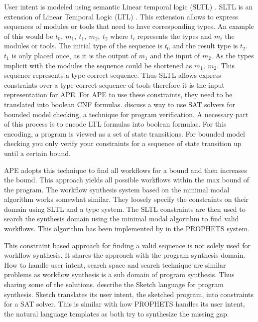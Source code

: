 \documentclass{article}
\begin{document}
User intent is modeled using semantic Linear temporal logic (SLTL) \cite{Steffen93moduleconfiguration}. SLTL is an extension of Linear Temporal Logic (LTL) \cite{emerson1990temporal}. This extension allows to express sequences of modules or tools that need to have corresponding types. An example of this would be $t_0,\ m_1,\ t_1,\ m_2,\ t_2$ where $t_i$ represents the types and $m_i$ the modules or tools. The initial type of the sequence is  $t_0$ and the result type is $t_2$. $t_1$ is only placed once, as it is the output of $m_1$ and the input of $m_2$. As the types implicit with the modules the sequence could be shortened as $m_1,\ m_2$. This sequence represents a type correct sequence. Thus SLTL allows express constraints over a type correct sequence of tools therefore it is the input representation for APE. 
For APE to use these constraints, they need to be translated into boolean CNF formulas. \cite{Bounded_model_checking} discuss a way to use SAT solvers for bounded model checking, a technique for program verification. A necessary part of this process is to encode LTL formulas into boolean formulas. For this encoding, a program is viewed as a set of state transitions. For bounded model checking you only verify your constraints for a sequence of state transition up until a certain bound. 

APE adopts this technique to find all workflows for a bound and then increases the bound. This approach yields all possible workflows within the max bound of the program. The workflow synthesis system\cite{lamprecht2010synthesis} based on the minimal modal algorithm\cite{Steffen93moduleconfiguration} works somewhat similar.
They loosely specify the constraints on their domain using SLTL and a type system. The SLTL constraints are then used to search the synthesis domain using the minimal modal algorithm to find valid workflows.  
This algorithm has been implemented by \cite{Prophets} in the PROPHETS system.


This constraint based approach for finding a valid sequence is not solely used for workflow synthesis. It shares the approach with the program synthesis domain. How to handle user intent, search space and search technique \cite{gulwani2010dimensions} are similar problems as workflow synthesis is a sub domain of program synthesis. Thus sharing some of the solutions. \cite{solar2008program} describe the Sketch language for program synthesis. Sketch translates its user intent, the sketched program, into constraints for a SAT solver. This is similar with how PROPHETS handles its user intent, the natural language templates as both try to synthesize the missing gap. 
\end{document}
